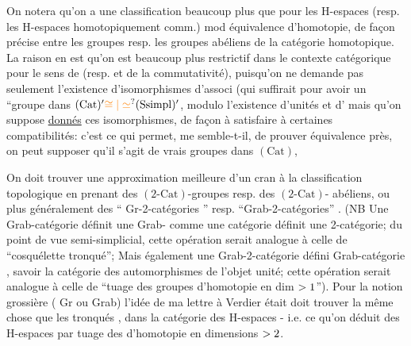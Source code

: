 On notera qu'on a une  classification beaucoup plus  que pour les H-espaces (resp. les H-espaces homotopiquement comm.) mod équivalence d'homotopie, de façon précise entre les groupes resp. les groupes abéliens de la catégorie homotopique. La raison en est qu'on est beaucoup plus restrictif dans le contexte catégorique pour le sens de  (resp. et de la commutativité), puisqu'on ne demande pas seulement l'existence d'isomorphismes d'associ\deleted{\unsure{,|$\times$}} (qui suffirait pour avoir un ``groupe dans  $(\mathrm{Cat})'\handwritten{\unsure{\cong|\simeq}}(\mathrm{Ssimpl})'$, modulo l'existence d'unités et d' mais qu'on suppose \uline{donnés} ces isomorphismes, de façon à satisfaire à certaines compatibilités: c'est ce qui permet, me semble-t-il, de prouver  équivalence près, on peut supposer qu'il s'agit de vrais groupes dans $(\mathrm{Cat})$, 


On doit trouver une approximation meilleure d'un cran à la classification topologique en prenant des $(2\text{-}\mathrm{Cat})$-groupes resp. des $(2\text{-}\mathrm{Cat})$- abéliens, ou plus généralement des `` Gr-2-catégories '' resp. ``Grab-2-catégories'' . (NB Une Grab-catégorie définit une Grab- comme une catégorie définit une 2-catégorie; du point de vue semi-simplicial, cette opération serait analogue à celle de ``cosquélette tronqué''; Mais également une Grab-2-catégorie défini  Grab-catégorie , savoir la catégorie des automorphismes de l'objet unité; cette  opération serait analogue à celle de ``tuage des groupes d'homotopie en dim $>1$''). Pour la notion grossière ( Gr ou Grab) l'idée de ma lettre à Verdier était  doit trouver la même chose que les tronqués , dans la catégorie \uline{} des H-espaces - i.e. ce qu'on déduit des H-espaces par tuage des  d'homotopie en dimensions $>2$.

